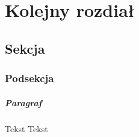 \chapter{Kolejny rozdiał}
\section{Sekcja}
\subsection{Podsekcja}
\paragraph{Paragraf}
Tekst\newline
Tekst
